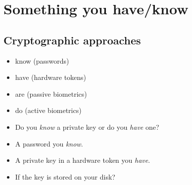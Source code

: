 \mode*




\section{Something you have/know}

\subsection{Cryptographic approaches}

\begin{frame}
  \begin{example}
    \begin{itemize}
      \item know (passwords)
      \item have (hardware tokens)
      \item are (passive biometrics)
      \item do (active biometrics)
    \end{itemize}
  \end{example}

  \pause{}

  \begin{remark}
    \begin{itemize}
      \item Do you \emph{know} a private key or do you \emph{have} one?
      \item A password you \emph{know}.
      \item A private key in a hardware token you \emph{have}.
      \item If the key is stored on your disk?
    \end{itemize}
  \end{remark}
\end{frame}

